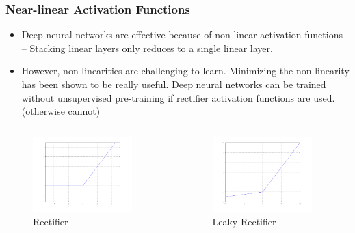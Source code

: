 \documentclass[8pt]{beamer}
\begin{document}
\begin{frame}
\frametitle{Near-linear Activation Functions}
 \begin{itemize}
  \item Deep neural networks are effective because of non-linear activation functions – Stacking linear
        layers only reduces to a single linear layer.
  \item However, non-linearities are challenging to learn. Minimizing the non-linearity has been shown to
        be really useful. Deep neural networks can be trained without unsupervised pre-training if rectifier
        activation functions are used. (otherwise cannot)
 \end{itemize}
\begin{columns}
\begin{column}{0.5\textwidth}
 \begin{figure}[h]
   \caption{Rectifier}
   \includegraphics[width=0.9\textwidth]{./rect.png}
 \end{figure}
\end{column}
\begin{column}{0.5\textwidth}
 \begin{figure}[h]
   \caption{Leaky Rectifier}
   \includegraphics[width=0.9\textwidth]{./leaky_rect.png}
 \end{figure}
\end{column}
\end{columns}
\end{frame}
\end{document}
